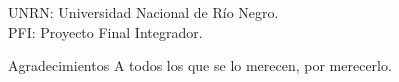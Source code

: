 \documentclass[12pt,screen,twoside,pagebackref]{unrnpfi}
\begin{document}

\begin{preliminary}



\begin{abreviaturas}
UNRN: Universidad Nacional de Río Negro.\\
PFI: Proyecto Final Integrador.
\end{abreviaturas}

\tableofcontents                %

\listoffigures                  %

\listoftables                   %



\end{preliminary}






\appendix


\begin{biblio}

\end{biblio}

\begin{postliminary}

\begin{seccion}{Agradecimientos}
A todos los que se lo merecen, por merecerlo.
\end{seccion}

\end{postliminary}
\end{document}
